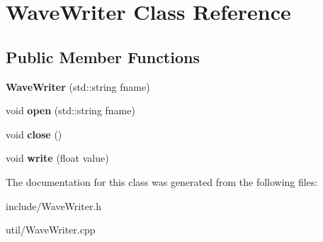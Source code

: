 \hypertarget{classWaveWriter}{}\section{Wave\+Writer Class Reference}
\label{classWaveWriter}
\subsection*{Public Member Functions}
\begin{DoxyCompactItemize}
\item 
{\bfseries Wave\+Writer} (std\+::string fname)\hypertarget{classWaveWriter_ab56ef6702c7c651004329fe76893b2f7}{}\label{classWaveWriter_ab56ef6702c7c651004329fe76893b2f7}

\item 
void {\bfseries open} (std\+::string fname)\hypertarget{classWaveWriter_a369569d5d2068f497731936073ad4ad1}{}\label{classWaveWriter_a369569d5d2068f497731936073ad4ad1}

\item 
void {\bfseries close} ()\hypertarget{classWaveWriter_ae50259472af637a4083399953440ee0e}{}\label{classWaveWriter_ae50259472af637a4083399953440ee0e}

\item 
void {\bfseries write} (float value)\hypertarget{classWaveWriter_a267d0704f57004f0adf079096d3dc460}{}\label{classWaveWriter_a267d0704f57004f0adf079096d3dc460}

\end{DoxyCompactItemize}


The documentation for this class was generated from the following files\+:\begin{DoxyCompactItemize}
\item 
include/Wave\+Writer.\+h\item 
util/Wave\+Writer.\+cpp\end{DoxyCompactItemize}
